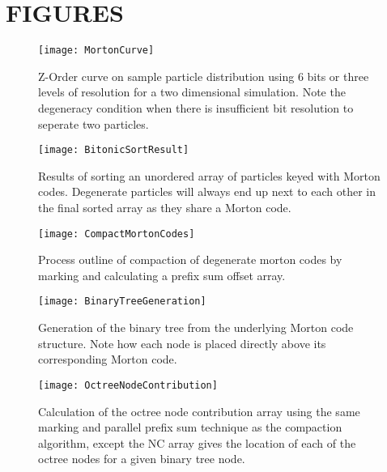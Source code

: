 \documentclass{thesis}
\begin{document}
\chapter{FIGURES}
\begin{figure}[h]
    \caption{\label{fig:MortonCurve} Z-Order curve on sample particle distribution using 6 bits or three levels of resolution for a two dimensional simulation.  Note the degeneracy condition when there is insufficient bit resolution to seperate two particles.}
    \centering
    \texttt{[image: MortonCurve]}
\end{figure}
\clearpage
\begin{figure}[h]
    \caption{\label{fig:BitonicSortResult} Results of sorting an unordered array of particles keyed with  Morton codes. Degenerate particles will always end up next to each other in the final sorted array as they share a  Morton code.}
    \centering
    \texttt{[image: BitonicSortResult]}
\end{figure}
\clearpage
\begin{sidewaysfigure}[h]
    \centering
    \texttt{[image: CompactMortonCodes]}
    \caption{\label{fig:CompactMortonCodes} Process outline of compaction of degenerate morton codes by marking and calculating a prefix sum offset array.}
\end{sidewaysfigure}
\clearpage
\begin{sidewaysfigure}[h]
    \centering
    \texttt{[image: BinaryTreeGeneration]}
    \caption{\label{fig:BinaryTreeGeneration} Generation of the binary tree from the underlying Morton code structure. Note how each node is placed directly above its corresponding Morton code.}
\end{sidewaysfigure}
\clearpage
\begin{sidewaysfigure}[h]
    \centering
    \texttt{[image: OctreeNodeContribution]}
    \caption{\label{fig:OctreeNodeContribution} Calculation of the octree node contribution array using the same marking and parallel prefix sum technique as the compaction algorithm, except the NC array gives the location of each of the octree nodes for a given binary tree node.}
\end{sidewaysfigure}
\end{document}
